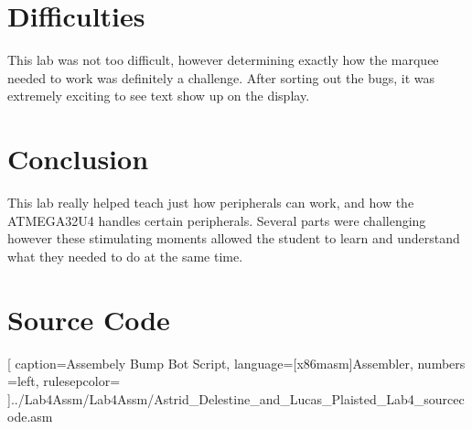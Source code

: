 \documentclass[12pt,letterpaper]{article}
\begin{document}
\section{Difficulties}
This lab was not too difficult, however determining exactly how the marquee needed to work was definitely a challenge. After sorting out the bugs, it was extremely exciting to see text show up on the display.  

\section{Conclusion}
This lab really helped teach just how peripherals can work, and how the ATMEGA32U4 handles certain peripherals. Several parts were challenging however these stimulating moments allowed the student to learn and understand what they needed to do at the same time. 

\section{Source Code}%

[
caption=Assembely Bump Bot Script,
language={[x86masm]Assembler},
numbers =left,
rulesepcolor=\color{blue}
]{../Lab4Assm/Lab4Assm/Astrid_Delestine_and_Lucas_Plaisted_Lab4_sourcecode.asm}
\end{document}
